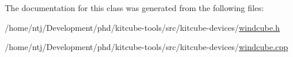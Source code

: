The documentation for this class was generated from the following files\-:\begin{DoxyCompactItemize}
\item 
/home/ntj/\-Development/phd/kitcube-\/tools/src/kitcube-\/devices/\hyperlink{windcube_8h}{windcube.\-h}\item 
/home/ntj/\-Development/phd/kitcube-\/tools/src/kitcube-\/devices/\hyperlink{windcube_8cpp}{windcube.\-cpp}\end{DoxyCompactItemize}
